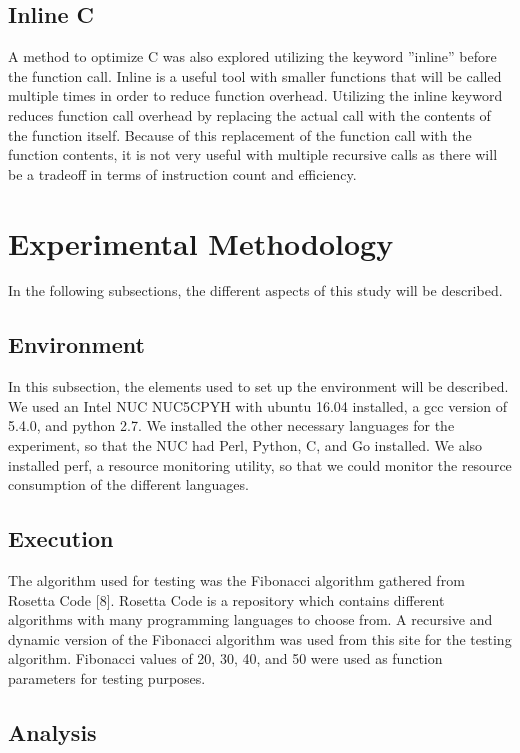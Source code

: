 \documentclass{sig-alternate}
\begin{document}
\subsection{Inline C}

A method to optimize C was also explored utilizing the keyword ''inline'' before the function call. Inline is a useful tool with smaller functions that will be called multiple times in order to reduce function overhead. Utilizing the inline keyword reduces function call overhead by replacing the actual call with the contents of the function itself. Because of this replacement of the function call with the function contents, it is not very useful with multiple recursive calls as there will be a tradeoff in terms of instruction count and efficiency.

\section{Experimental Methodology}

In the following subsections, the different aspects of this study will be described.

\subsection{Environment}

In this subsection, the elements used to set up the environment will be described. We used an Intel NUC NUC5CPYH with ubuntu 16.04 installed, a gcc version of 5.4.0, and python 2.7. We installed the other necessary languages for the experiment, so that the NUC had Perl, Python, C, and Go installed. We also installed perf, a resource monitoring utility, so that we could monitor the resource consumption of the different languages.    

\subsection{Execution}

The algorithm used for testing was the Fibonacci algorithm gathered from Rosetta Code [8]. Rosetta Code is a repository which contains different algorithms with many programming languages to choose from. A recursive and dynamic version of the Fibonacci algorithm was used from this site for the testing algorithm. Fibonacci values of 20, 30, 40, and 50 were used as function parameters for testing purposes.

\subsection{Analysis}
\end{document}
